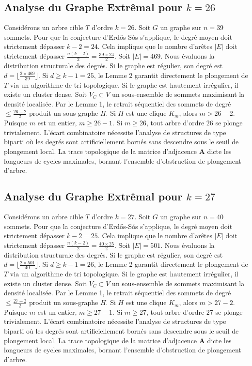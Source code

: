 \documentclass[11pt,a4paper]{article}
\begin{document}
\subsection{Analyse du Graphe Extr\^emal pour $k=26$}
Consid\'erons un arbre cible $T$ d'ordre $k=26$.
Soit $G$ un graphe sur $n=39$ sommets.
Pour que la conjecture d'Erd\H{o}s-S\'os s'applique, le degr\'e moyen doit strictement d\'epasser $k-2 = 24$.
Cela implique que le nombre d'ar\^etes $|E|$ doit strictement d\'epasser $\frac{n(k-2)}{2} = \frac{39 \times 24}{2}$.
Soit $|E| = 469$.
Nous \'evaluons la distribution structurale des degr\'es. Si le graphe est r\'egulier, son degr\'e est $d = \lfloor \frac{2 \times 469}{39} \rfloor$.
Si $d \geq k-1 = 25$, le Lemme 2 garantit directement le plongement de $T$ via un algorithme de tri topologique.
Si le graphe est hautement irr\'egulier, il existe un cluster dense. Soit $V_C \subset V$ un sous-ensemble de sommets maximisant la densit\'e localis\'ee.
Par le Lemme 1, le retrait s\'equentiel des sommets de degr\'e $\leq \frac{26-2}{2}$ produit un sous-graphe $H$.
Si $H$ est une clique $K_{m}$, alors $m > 26-2$. Puisque $m$ est un entier, $m \geq 26-1$. Si $m \geq 26$, tout arbre d'ordre $26$ se plonge trivialement.
L'\'ecart combinatoire n\'ecessite l'analyse de structures de type biparti o\`u les degr\'es sont artificiellement born\'es sans descendre sous le seuil de plongement local. La trace topologique de la matrice d'adjacence $\mathbf{A}$ dicte les longueurs de cycles maximales, bornant l'ensemble d'obstruction de plongement d'arbre.


\subsection{Analyse du Graphe Extr\^emal pour $k=27$}
Consid\'erons un arbre cible $T$ d'ordre $k=27$.
Soit $G$ un graphe sur $n=40$ sommets.
Pour que la conjecture d'Erd\H{o}s-S\'os s'applique, le degr\'e moyen doit strictement d\'epasser $k-2 = 25$.
Cela implique que le nombre d'ar\^etes $|E|$ doit strictement d\'epasser $\frac{n(k-2)}{2} = \frac{40 \times 25}{2}$.
Soit $|E| = 501$.
Nous \'evaluons la distribution structurale des degr\'es. Si le graphe est r\'egulier, son degr\'e est $d = \lfloor \frac{2 \times 501}{40} \rfloor$.
Si $d \geq k-1 = 26$, le Lemme 2 garantit directement le plongement de $T$ via un algorithme de tri topologique.
Si le graphe est hautement irr\'egulier, il existe un cluster dense. Soit $V_C \subset V$ un sous-ensemble de sommets maximisant la densit\'e localis\'ee.
Par le Lemme 1, le retrait s\'equentiel des sommets de degr\'e $\leq \frac{27-2}{2}$ produit un sous-graphe $H$.
Si $H$ est une clique $K_{m}$, alors $m > 27-2$. Puisque $m$ est un entier, $m \geq 27-1$. Si $m \geq 27$, tout arbre d'ordre $27$ se plonge trivialement.
L'\'ecart combinatoire n\'ecessite l'analyse de structures de type biparti o\`u les degr\'es sont artificiellement born\'es sans descendre sous le seuil de plongement local. La trace topologique de la matrice d'adjacence $\mathbf{A}$ dicte les longueurs de cycles maximales, bornant l'ensemble d'obstruction de plongement d'arbre.
\end{document}

